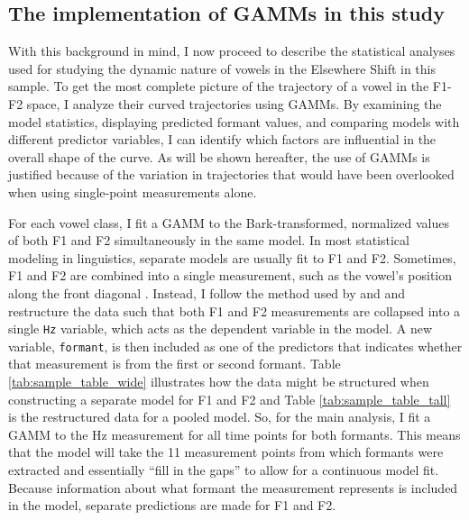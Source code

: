 \subsection{The implementation of GAMMs in this study}
\label{gamms_in_this_study}

With this background in mind, I now proceed to describe the statistical analyses used for studying the dynamic nature of vowels in the Elsewhere Shift in this sample. To get the most complete picture of the trajectory of a vowel in the F1-F2 space, I analyze their curved trajectories using GAMMs. By examining the model statistics, displaying predicted formant values, and comparing models with different predictor variables, I can identify which factors are influential in the overall shape of the curve. As will be shown hereafter, the use of GAMMs is justified because of the variation in trajectories that would have been overlooked when using single-point measurements alone.

For each vowel class, I fit a GAMM to the Bark-transformed, normalized values of both F1 and F2 simultaneously in the same model. In most statistical modeling in linguistics, separate models are usually fit to F1 and F2. Sometimes, F1 and F2 are combined into a single measurement, such as the vowel's position along the front diagonal \citep{labov_etal_2013}. Instead, I follow the method used by \citet{gahl_baayen_2019} and \citet{renwick_stanley_2020} and restructure the data such that both F1 and F2 measurements are collapsed into a single \texttt{Hz} variable, which acts as the dependent variable in the model. A new variable, \texttt{formant}, is then included as one of the predictors that indicates whether that measurement is from the first or second formant. Table \ref{tab:sample_table_wide} illustrates how the data might be structured when constructing a separate model for F1 and F2 and Table \ref{tab:sample_table_tall} is the restructured data for a pooled model. So, for the main analysis, I fit a GAMM to the Hz measurement for all time points for both formants. This means that the model will take the 11 measurement points from which formants were extracted and essentially ``fill in the gaps'' to allow for a continuous model fit. Because information about what formant the measurement represents is included in the model, separate predictions are made for F1 and F2.

